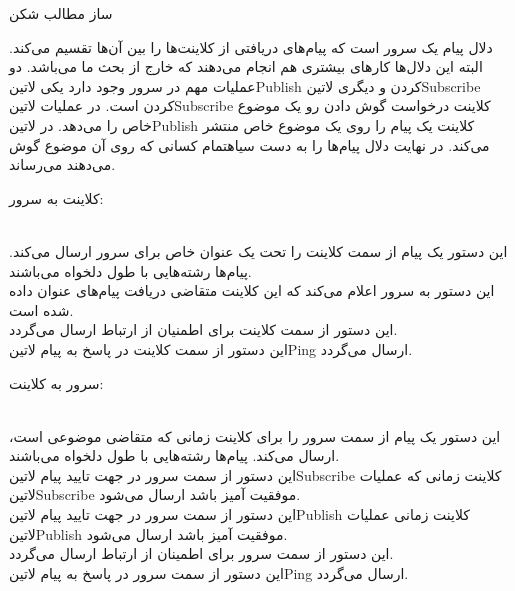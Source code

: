 \documentclass[]{article}
\begin{document}
  ‌ساز
  ‌مطالب
  ‌شکن


  دلال پیام یک سرور است که پیام‌های دریافتی از کلاینت‌ها را بین آن‌ها تقسیم می‌کند. البته این دلال‌ها کارهای بیشتری هم انجام می‌دهند که خارج از بحث ما می‌باشد.
  دو عملیات مهم در سرور وجود دارد یکی ‌لاتین{Publish} کردن و دیگری ‌لاتین{Subscribe} کردن است. در عملیات ‌لاتین{Subscribe} کلاینت درخواست گوش دادن رو یک موضوع خاص را می‌دهد.
  در ‌لاتین{Publish} کلاینت یک پیام را روی یک موضوع خاص منتشر می‌کند. در نهایت دلال پیام‌ها را به دست ‌سیاه{تمام} کسانی که روی آن موضوع گوش می‌دهند می‌رساند.


  کلاینت به سرور:

    \\ این دستور یک پیام از سمت کلاینت را تحت یک عنوان خاص برای سرور ارسال می‌کند. پیام‌ها رشته‌هایی با طول دلخواه می‌باشند.
    \\ این دستور به سرور اعلام می‌کند که این کلاینت متقاضی دریافت پیام‌های عنوان داده شده است.
    \\ این دستور از سمت کلاینت برای اطمنیان از ارتباط ارسال می‌گردد.
    \\ این دستور از سمت کلاینت در پاسخ به پیام ‌لاتین{Ping} ارسال می‌گردد.

  سرور به کلاینت:

    \\ این دستور یک پیام از سمت سرور را برای کلاینت زمانی که متقاضی موضوعی است، ارسال می‌کند. پیام‌ها رشته‌هایی با طول دلخواه می‌باشند.
    \\ این دستور از سمت سرور در جهت تایید پیام ‌لاتین{Subscribe} کلاینت زمانی که عملیات ‌لاتین{Subscribe} موفقیت آمیز باشد ارسال می‌شود.
    \\ این دستور از سمت سرور در جهت تایید پیام ‌لاتین{Publish} کلاینت زمانی عملیات ‌لاتین{Publish} موفقیت آمیز باشد ارسال می‌شود.
    \\ این دستور از سمت سرور برای اطمینان از ارتباط ارسال می‌گردد.
    \\ این دستور از سمت سرور در پاسخ به پیام ‌لاتین{Ping} ارسال می‌گردد.
\end{document}
